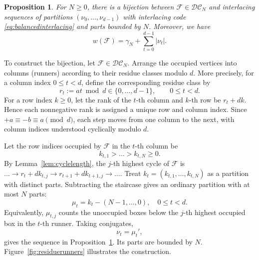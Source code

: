 \documentclass[12pt,reqno]{amsart}
\numberwithin{equation}{section}
\newtheorem{proposition}[theorem]{Proposition}
\theoremstyle{definition}
\theoremstyle{remark}
\theoremstyle{plain}
\begin{document}
\begin{proposition}\label{prop:cycleinterlacing}
    For $N\ge 0$, there is a bijection between $\mathcal F\in \mathcal{DC}_N$ and interlacing sequences of partitions $(\nu_0,\dots,\nu_{d-1})$ with interlacing code \eqref{eq:balancedinterlacing} and parts bounded by $N$. Moreover, we have
    \begin{equation}\label{eq:cyclevolume}
     w(\mathcal F)=\gamma_N+\sum_{t=0}^{d-1}|\nu_t|.
    \end{equation}
\end{proposition}

To construct the bijection, let $\mathcal F\in \mathcal{DC}_N$. Arrange the occupied vertices into columns (runners) according to their residue classes modulo $d$. More precisely, for a column index $0\leq t<d$, define the corresponding residue class by
\begin{equation}\label{eq:runners}
 r_t:=at\bmod d\in\{0,\ldots,d-1\},\qquad 0\le t<d.
\end{equation}
For a row index $k\ge 0$, let the rank of the $t$-th column and $k$-th row be $r_t+dk$. Hence each nonnegative rank is assigned a unique row and column index. 
Since $+a\equiv-b\equiv a\pmod d$, each step moves from one column to the next, with column indices understood cyclically modulo $d$.

Let the row indices occupied by $\mathcal F$ in the $t$-th column be
\[ k_{t,1}>\dots>k_{t,N}\ge 0.\]
By Lemma~\ref{lem:cyclelength}, the $j$-th highest cycle of $\mathcal F$ is $\dots\to r_t+dk_{t,j}\to r_{t+1}+dk_{t+1,j}\to\dots$.
Treat $k_t=(k_{t,1},\dots,k_{t,N})$ as a partition with distinct parts. Subtracting the staircase gives an ordinary partition with at most $N$ parts:
\[ \mu_t=k_t-(N-1,\dots,0), \quad 0\leq t<d.\]
Equivalently, $\mu_{t,j}$ counts the unoccupied boxes below the $j$-th highest occupied box in the $t$-th runner. Taking conjugates,
\[ \nu_t=\mu_t',\]
gives the sequence in Proposition~\ref{prop:cycleinterlacing}. Its parts are bounded by $N$. Figure~\ref{fig:residuerunners} illustrates the construction.
\end{document}

